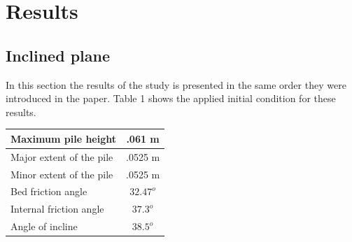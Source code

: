 \documentclass[letterpaper,10pt]{article}
\begin{document}
\section{Results} \label{results}
\subsection{Inclined plane}
In this section the results of the study is presented in the same order they were introduced in the paper.
Table 1 shows the applied initial condition for these results.
\begin{center}
        \begin{tabular}{|l|c|}
                \hline
                Maximum pile height       & .061 m \\
                \hline
                Major extent of the pile  & .0525 m \\
                \hline
                Minor extent of the pile  & .0525 m \\
                \hline           
                Bed friction angle        & $32.47^o$ \\
                \hline
                Internal friction angle  & $37.3^o$ \\
                \hline
                Angle of incline          & $38.5^o$ \\
                \hline
        \end{tabular}
\end{center}
\end{document}

